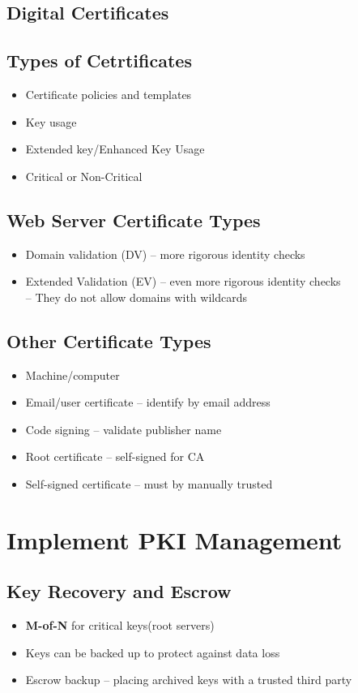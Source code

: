 	\subsection {Digital Certificates}
	\subsection {Types of Cetrtificates}
		\begin{itemize}
			\item Certificate policies and templates
			\item Key usage
			\item Extended key/Enhanced Key Usage
			\item Critical or Non-Critical
		\end{itemize}
	\subsection {Web Server Certificate Types}
		\begin{itemize}
			\item Domain validation (DV) -- more rigorous identity checks
			\item Extended Validation (EV) -- even more rigorous identity checks \\
				-- They do not allow domains with wildcards
		\end{itemize}
	\subsection {Other Certificate Types}
		\begin{itemize}
			\item Machine/computer
			\item Email/user certificate -- identify by email address
			\item Code signing -- validate publisher name
			\item Root certificate -- self-signed for CA
			\item Self-signed certificate -- must by manually trusted
		\end{itemize}

\section {Implement PKI Management}
	\subsection {Key Recovery and Escrow}
		\begin{itemize}
			\item \textbf{M-of-N} for critical keys(root servers)
			\item Keys can be backed up to protect against data loss
			\item Escrow backup -- placing archived keys with a trusted third party
		\end{itemize}
